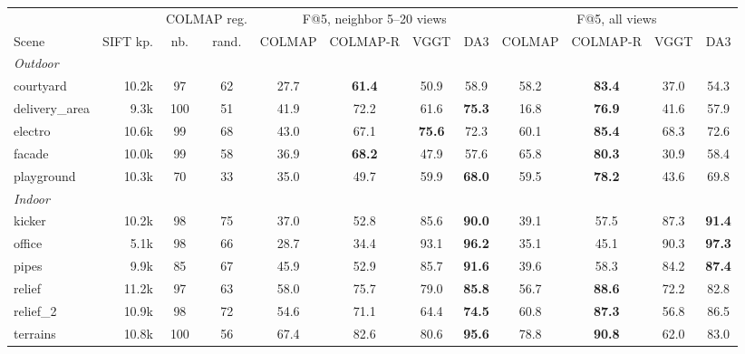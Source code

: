 \begin{tabular}{lr cc cccc cccc}
\toprule
 & & \multicolumn{2}{c}{COLMAP reg.} & \multicolumn{4}{c}{F@5, neighbor 5--20 views} & \multicolumn{4}{c}{F@5, all views} \\
\cmidrule(lr){3-4}\cmidrule(lr){5-8}\cmidrule(lr){9-12}
Scene & SIFT kp. & nb. & rand. & COLMAP & COLMAP-R & VGGT & DA3 & COLMAP & COLMAP-R & VGGT & DA3 \\
\midrule
\multicolumn{12}{l}{\emph{Outdoor}} \\
courtyard & 10.2k & 97 & 62 & 27.7 & \textbf{61.4} & 50.9 & 58.9 & 58.2 & \textbf{83.4} & 37.0 & 54.3 \\
delivery\_area & 9.3k & 100 & 51 & 41.9 & 72.2 & 61.6 & \textbf{75.3} & 16.8 & \textbf{76.9} & 41.6 & 57.9 \\
electro & 10.6k & 99 & 68 & 43.0 & 67.1 & \textbf{75.6} & 72.3 & 60.1 & \textbf{85.4} & 68.3 & 72.6 \\
facade & 10.0k & 99 & 58 & 36.9 & \textbf{68.2} & 47.9 & 57.6 & 65.8 & \textbf{80.3} & 30.9 & 58.4 \\
playground & 10.3k & 70 & 33 & 35.0 & 49.7 & 59.9 & \textbf{68.0} & 59.5 & \textbf{78.2} & 43.6 & 69.8 \\
\midrule
\multicolumn{12}{l}{\emph{Indoor}} \\
kicker & 10.2k & 98 & 75 & 37.0 & 52.8 & 85.6 & \textbf{90.0} & 39.1 & 57.5 & 87.3 & \textbf{91.4} \\
office & 5.1k & 98 & 66 & 28.7 & 34.4 & 93.1 & \textbf{96.2} & 35.1 & 45.1 & 90.3 & \textbf{97.3} \\
pipes & 9.9k & 85 & 67 & 45.9 & 52.9 & 85.7 & \textbf{91.6} & 39.6 & 58.3 & 84.2 & \textbf{87.4} \\
relief & 11.2k & 97 & 63 & 58.0 & 75.7 & 79.0 & \textbf{85.8} & 56.7 & \textbf{88.6} & 72.2 & 82.8 \\
relief\_2 & 10.9k & 98 & 72 & 54.6 & 71.1 & 64.4 & \textbf{74.5} & 60.8 & \textbf{87.3} & 56.8 & 86.5 \\
terrains & 10.8k & 100 & 56 & 67.4 & 82.6 & 80.6 & \textbf{95.6} & 78.8 & \textbf{90.8} & 62.0 & 83.0 \\
\bottomrule
\end{tabular}
